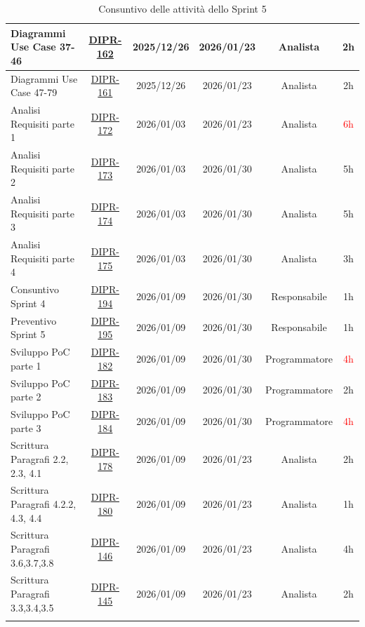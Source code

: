 \documentclass[a4paper,12pt]{article}
\begin{document}
\begin{longtable}{|p{4cm}|c|c|c|c|c|}
        \hline
        Diagrammi Use Case 37-46 & \href{https://7zpus.atlassian.net/browse/DIPR-162}{DIPR-162} & 2025/12/26 & 2026/01/23 & Analista & 2h \\
        \hline
        Diagrammi Use Case 47-79 & \href{https://7zpus.atlassian.net/browse/DIPR-161}{DIPR-161} & 2025/12/26 & 2026/01/23 & Analista & 2h \\
        \hline
        Analisi Requisiti parte 1 & \href{https://7zpus.atlassian.net/browse/DIPR-172}{DIPR-172} & 2026/01/03 & 2026/01/23 & Analista & \textcolor{red}{6h} \\
        \hline
        Analisi Requisiti parte 2 & \href{https://7zpus.atlassian.net/browse/DIPR-173}{DIPR-173} & 2026/01/03 & 2026/01/30 & Analista & 5h \\
        \hline
        Analisi Requisiti parte 3 & \href{https://7zpus.atlassian.net/browse/DIPR-174}{DIPR-174} & 2026/01/03 & 2026/01/30 & Analista & 5h \\
        \hline
        Analisi Requisiti parte 4 & \href{https://7zpus.atlassian.net/browse/DIPR-175}{DIPR-175} & 2026/01/03 & 2026/01/30 & Analista & \textcolor{green!50!black}{3h}\\
        \hline
        Consuntivo Sprint 4 & \href{https://7zpus.atlassian.net/browse/DIPR-194}{DIPR-194} & 2026/01/09 & 2026/01/30 & Responsabile & 1h \\
        \hline
        Preventivo Sprint 5 & \href{https://7zpus.atlassian.net/browse/DIPR-195}{DIPR-195} & 2026/01/09 & 2026/01/30 & Responsabile & 1h \\
        \hline
        Sviluppo PoC parte 1 & \href{https://7zpus.atlassian.net/browse/DIPR-182}{DIPR-182} & 2026/01/09 & 2026/01/30 & Programmatore & \textcolor{red}{4h}\\
        \hline
        Sviluppo PoC parte 2 & \href{https://7zpus.atlassian.net/browse/DIPR-183}{DIPR-183} & 2026/01/09 & 2026/01/30 & Programmatore & 2h \\
        \hline
        Sviluppo PoC parte 3 & \href{https://7zpus.atlassian.net/browse/DIPR-184}{DIPR-184} & 2026/01/09 & 2026/01/30 & Programmatore & \textcolor{red}{4h}\\
        \hline
        Scrittura Paragrafi 2.2, 2.3, 4.1 & \href{https://7zpus.atlassian.net/browse/DIPR-178}{DIPR-178} & 2026/01/09 & 2026/01/23 & Analista & 2h \\
        \hline
        Scrittura Paragrafi 4.2.2, 4.3, 4.4 & \href{https://7zpus.atlassian.net/browse/DIPR-180}{DIPR-180} & 2026/01/09 & 2026/01/23 & Analista & \textcolor{green!50!black}{1h} \\
        \hline
        Scrittura Paragrafi 3.6,3.7,3.8& \href{https://7zpus.atlassian.net/browse/DIPR-146}{DIPR-146} & 2026/01/09 & 2026/01/23 & Analista & 4h \\
        \hline
        Scrittura Paragrafi 3.3,3.4,3.5 & \href{https://7zpus.atlassian.net/browse/DIPR-145}{DIPR-145} & 2026/01/09 & 2026/01/23 & Analista & \textcolor{green!50!black}{2h}\\
        \hline
        \rowcolor{white}
        \caption{Consuntivo delle attività dello Sprint 5}
\end{longtable}
\end{document}
